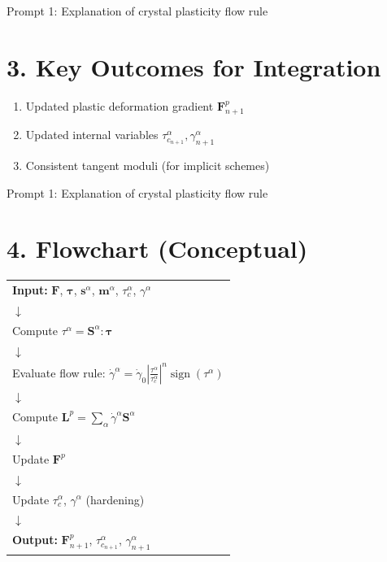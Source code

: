 \documentclass[12pt]{article}
\begin{document}
\begin{summary}{Prompt 1: Explanation of crystal plasticity flow rule}
\section*{3. Key Outcomes for Integration}
\begin{enumerate}
    \item Updated plastic deformation gradient \( \mathbf{F}^p_{n+1} \)  
    \item Updated internal variables \( \tau_{c_{n+1}}^\alpha, \gamma^\alpha_{n+1} \)  
    \item Consistent tangent moduli (for implicit schemes)  
\end{enumerate}
\end{summary}



\begin{summary}{Prompt 1: Explanation of crystal plasticity flow rule}
\section*{4. Flowchart (Conceptual)}
\begin{tabular}{l}
\textbf{Input:} $\mathbf{F}$, $\boldsymbol{\tau}$, $\mathbf{s}^\alpha$, $\mathbf{m}^\alpha$, $\tau_c^\alpha$, $\gamma^\alpha$ \\
\quad $\downarrow$ \\
Compute $\tau^\alpha = \mathbf{S}^\alpha : \boldsymbol{\tau}$ \\
\quad $\downarrow$ \\
Evaluate flow rule: $\dot{\gamma}^\alpha = \dot{\gamma}_0 \left| \frac{\tau^\alpha}{\tau_c^\alpha} \right|^n \operatorname{sign}(\tau^\alpha)$ \\
\quad $\downarrow$ \\
Compute $\mathbf{L}^p = \sum_\alpha \dot{\gamma}^\alpha \mathbf{S}^\alpha$ \\
\quad $\downarrow$ \\
Update $\mathbf{F}^p$ \\
\quad $\downarrow$ \\
Update $\tau_c^\alpha$, $\gamma^\alpha$ (hardening) \\
\quad $\downarrow$ \\
\textbf{Output:} $\mathbf{F}^p_{n+1}$, $\tau_{c_{n+1}}^\alpha$, $\gamma_{n+1}^\alpha$ \\
\end{tabular}
\vspace{1em}

\end{summary}
\end{document}
